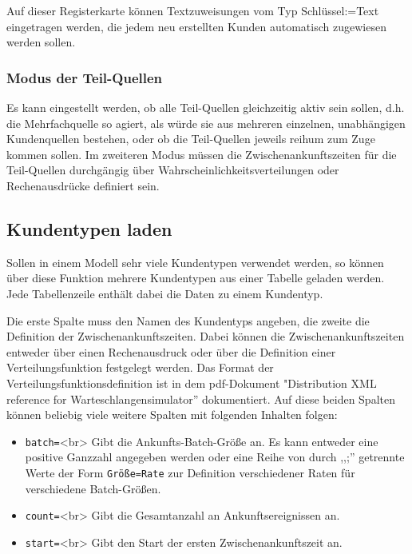 Auf dieser Registerkarte können Textzuweisungen vom Typ Schlüssel:=Text eingetragen werden,
die jedem neu erstellten Kunden automatisch zugewiesen werden sollen.

\subsubsection*{Modus der Teil-Quellen}

Es kann eingestellt werden, ob alle Teil-Quellen gleichzeitig aktiv sein sollen, d.h. die Mehrfachquelle
so agiert, als würde sie aus mehreren einzelnen, unabhängigen Kundenquellen bestehen, oder ob die Teil-Quellen
jeweils reihum zum Zuge kommen sollen. Im zweiteren Modus müssen die Zwischenankunftszeiten für die Teil-Quellen
durchgängig über Wahrscheinlichkeitsverteilungen oder Rechenausdrücke definiert sein.

\subsection*{Kundentypen laden}

Sollen in einem Modell sehr viele Kundentypen verwendet werden, so können über diese Funktion mehrere
Kundentypen aus einer Tabelle geladen werden. Jede Tabellenzeile enthält dabei die Daten zu einem Kundentyp.

Die erste Spalte muss den Namen des Kundentyps angeben, die zweite die Definition der Zwischenankunftszeiten.
Dabei können die Zwischenankunftszeiten entweder über einen Rechenausdruck oder über die Definition einer
Verteilungsfunktion festgelegt werden. Das Format der Verteilungsfunktionsdefinition ist in dem pdf-Dokument
"Distribution XML reference for Warteschlangensimulator'' dokumentiert. Auf diese beiden Spalten können beliebig
viele weitere Spalten mit folgenden Inhalten folgen:

\begin{itemize}
  \item \texttt{batch=}<br>
  Gibt die Ankunfts-Batch-Größe an. Es kann entweder eine positive Ganzzahl angegeben werden oder eine Reihe von
  durch ,,;'' getrennte Werte der Form \texttt{Größe=Rate} zur Definition verschiedener Raten für verschiedene Batch-Größen. 
  \item \texttt{count=}<br>
  Gibt die Gesamtanzahl an Ankunftsereignissen an. 
  \item \texttt{start=}<br>
  Gibt den Start der ersten Zwischenankunftszeit an. 
\end{itemize}

